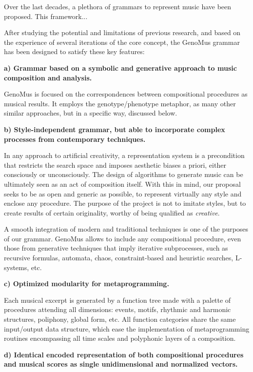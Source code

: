 \documentclass{article}
\begin{document}
Over the last decades, a plethora of grammars to represent music have been proposed. This framework...  

After studying the potential and limitations of previous research, and based on the experience of several iterations of the core concept, the GenoMus grammar has been designed to satisfy these key features:

\textbf{a) Grammar based on a symbolic and generative approach to music composition and analysis.}

GenoMus is focused on the correspondences between compositional procedures as musical results. It employs the genotype/phenotype metaphor, as many other similar approaches, but in a specific way, discussed below.

\textbf{b) Style-independent grammar, but able to incorporate complex processes from contemporary techniques.} 

In any approach to artificial creativity, a representation system is a precondition that restricts the search space and imposes aesthetic biases a priori, either consciously or unconsciously. The design of algorithms to generate music can be ultimately seen as an act of composition itself. With this in mind, our proposal seeks to be as open and generic as possible, to represent virtually any style and enclose any procedure. The purpose of the project is not to imitate styles, but to create results of certain originality, worthy of being qualified as \emph{creative}. 

A smooth integration of modern and traditional techniques is one of the purposes of our grammar. GenoMus allows to include any compositional procedure, even those from generative techniques that imply iterative subprocesses, such as recursive formulas, automata, chaos, constraint-based and heuristic searches, L-systems, etc. 

\textbf{c) Optimized modularity for metaprogramming.}

Each musical excerpt is generated by a function tree made with a palette of procedures attending all dimensions: events, motifs, rhythmic and harmonic structures, poliphony, global form, etc. All function categories share the same input/output data structure, which ease the implementation of metaprogramming routines encompassing all time scales and polyphonic layers of a composition.

\textbf{d) Identical encoded representation of both compositional procedures and musical scores as single unidimensional and normalized vectors.}
\end{document}
